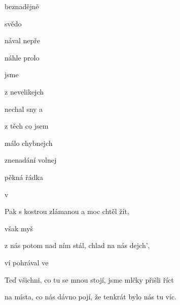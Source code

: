 

\zs
{} beznadějně 

 svědo

 nával nepře

 náhle prolo

 jsme 

 z nevelikejch 

 nechal sny a 

 z těch  co jsem 
\ks

\zr
{} málo chybnejch 

 znenadání volnej 

 pěkná řádka 

v   

Pak  s kostrou zlámanou a  moc chtěl žít,

však  myš

z nás  potom nad ním stál, chlad  na nás dejch',

ví pohrával ve 
\kr

\zs
Teď všichni, co tu se mnou stojí, jsme mlčky  přišli říct

na místa, co nás dávno pojí, že tenkrát bylo nás tu víc.
\ks

\kp
